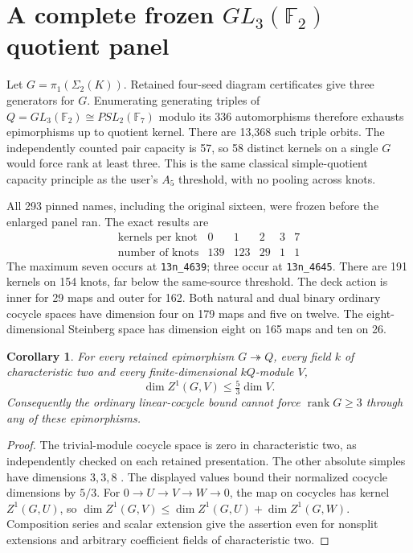 \documentclass[11pt]{article}
\newtheorem{corollary}[theorem]{Corollary}
\newcommand{\F}{\mathbb F}
\newcommand{\rank}{\operatorname{rank}}
\begin{document}
\section{A complete frozen \texorpdfstring{$GL_3(\F_2)$}{GL3(F2)} quotient panel}

Let $G=\pi_1(\Sigma_2(K))$. Retained four-seed diagram certificates
give three generators for $G$. Enumerating generating triples of
$Q=GL_3(\F_2)\cong PSL_2(\F_7)$ modulo its 336 automorphisms
therefore exhausts epimorphisms up to quotient kernel. There are
13,368 such triple orbits. The independently counted pair capacity
is 57, so 58 distinct kernels on a single $G$ would force rank
at least three. This is the same classical simple-quotient capacity
principle as the user's $A_5$ threshold, with no pooling across
knots.

All 293 pinned names, including the original sixteen, were frozen
before the enlarged panel ran. The exact results are
\[
\begin{array}{c|rrrrr}
\text{kernels per knot}&0&1&2&3&7\\\hline
\text{number of knots}&139&123&29&1&1
\end{array}
\]
The maximum seven occurs at \texttt{13n\_4639}; three occur at
\texttt{13n\_4645}. There are 191 kernels on 154 knots, far below
the same-source threshold. The deck action is inner for 29 maps
and outer for 162. Both natural and dual binary ordinary cocycle
spaces have dimension four on 179 maps and five on twelve.
The eight-dimensional Steinberg space has dimension eight on
165 maps and ten on 26.

\begin{corollary}\label{cor:modules}
For every retained epimorphism $G\twoheadrightarrow Q$, every
field $k$ of characteristic two and every finite-dimensional
$kQ$-module $V$,
\[
 \dim Z^1(G,V)\le\tfrac53\dim V.
\]
Consequently the ordinary linear-cocycle bound cannot force
$\rank G\ge3$ through any of these epimorphisms.
\end{corollary}
\begin{proof}
The trivial-module cocycle space is zero in characteristic two,
as independently checked on each retained presentation. The other
absolute simples have dimensions $3,3,8$ \cite{atlas}. The displayed
values bound their normalized cocycle dimensions by $5/3$.
For $0\to U\to V\to W\to0$, the map on cocycles has kernel
$Z^1(G,U)$, so
$\dim Z^1(G,V)\le\dim Z^1(G,U)+\dim Z^1(G,W)$.
Composition series and scalar extension give the assertion even
for nonsplit extensions and arbitrary coefficient fields of
characteristic two.
\end{proof}
\end{document}
